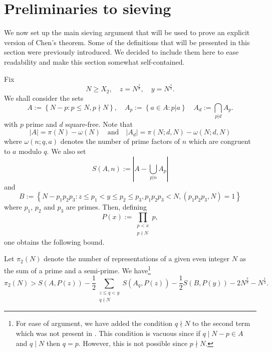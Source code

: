 \documentclass[12pt]{amsart}
\begin{document}
\section{Preliminaries to sieving}
\label{sec:ps}
We now set up the main sieving argument that will be used to prove an explicit version of Chen's theorem. Some of the definitions that will be presented in this section were previously introduced. We decided to include them here to ease readability and make this section somewhat self-contained.\par
Fix 
\begin{equation}\label{Nyzeq}
N\ge X_2,\quad  z=N^{\frac{1}{8}},\quad  y=N^{\frac{1}{3}}.
\end{equation}
We shall consider the sets
\begin{equation}\label{Aapeq}
A:=\left\{ N-p:p\le N, p\nmid N \right\},\quad A_p:=\left\{ a \in A:p|a \right\} \quad 
A_d:=\bigcap_{p|d} A_p.
\end{equation}
with $p$ prime and $d$ square-free. Note that
\begin{equation}\label{AAqeq}
    \left|A\right|=\pi(N)-\omega(N)\quad \text{and}\quad\left|A_d\right|=\pi(N;d,N)-\omega (N;d,N)
\end{equation} 
where $\omega (n;q,a)$ denotes the number of prime factors of $n$ which are congruent to $a$ modulo $q$.
We also set
\begin{equation} \label{eq: def-S-A-n}
S(A,n):=\left| A-\bigcup_{p|n} A_p\right|
\end{equation}
and
\begin{equation}\label{Bset}
B:=\left\{ N-p_1p_2p_3:z \le p_1<y \le p_2 \le p_3, p_1p_2p_3 <N, (p_1p_2p_3,N)=1   \right\}
\end{equation}
where $p_1$, $p_2$ and $p_3$ are primes. Then, defining 
\begin{equation} \label{eq: def-P(x)}
    P(x):=\prod_{\substack{p<x\\p\nmid N}} p,
\end{equation}
one obtains the following bound.
\begin{lemma}
\label{lem:>}
Let $\pi_2(N)$ denote the number of representations of a given even integer $N$ as the sum of a prime and a semi-prime. We have\footnote{For ease of argument, we have added the condition $q\nmid N$ to the second term which was not present in \cite{Nathanson}. This condition is vacuous since if $q\mid N-p\in A$ and $q\mid N$ then $q=p$. However, this is not possible since $p\nmid N$.}
\begin{equation*}
\pi_2(N)>S(A,P(z))-\frac{1}{2}\sum_{\substack{z \le q <y\\q\nmid N}}S(A_q,P(z))-\frac{1}{2}S(B,P(y))-2N^{\frac{7}{8}}-N^{\frac{1}{3}}.
\end{equation*}
\end{lemma}
\end{document}
